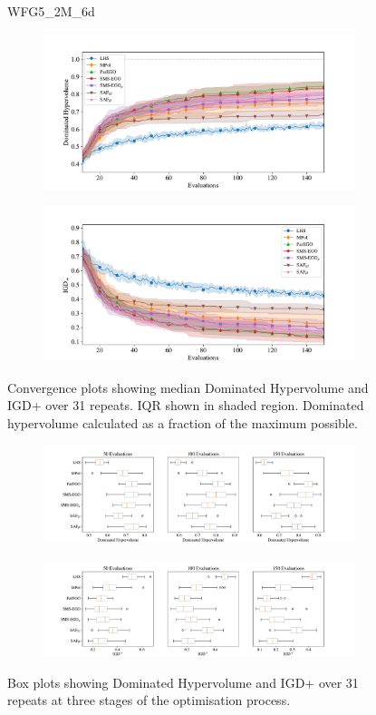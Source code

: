 \documentclass[conference]{IEEEtran}
\begin{document}
\clearpage

\begin{figure}
WFG5\_2M\_6d


\begin{subfigure}[hbt!]{\linewidth}

    \centering
    \includegraphics[width=0.7\linewidth]{figures/wfg5_2obj_6dim_hv_plot.pdf}
\end{subfigure}
\begin{subfigure}[h]{\linewidth}
    \centering
    \includegraphics[width=0.7\linewidth]{figures/wfg5_2obj_6dim_igd_plot.pdf}
\end{subfigure}
    \caption{Convergence plots showing median Dominated Hypervolume and IGD+ over 31 repeats. IQR shown in shaded region. Dominated hypervolume calculated as a fraction of the maximum possible.}
\vspace{\floatsep}
\begin{subfigure}[t]{\linewidth}
    \centering
    \includegraphics[width=0.8\linewidth]{figures/wfg5_2obj_6dim_hv_boxplot.pdf}
\end{subfigure}
\begin{subfigure}[t]{\linewidth}
    \centering
    \includegraphics[width=0.8\linewidth]{figures/wfg5_2obj_6dim_igd_boxplot.pdf}
\end{subfigure}
    \caption{Box plots showing Dominated Hypervolume and IGD+ over 31 repeats at three stages of the optimisation process.}
\end{figure}
\end{document}
